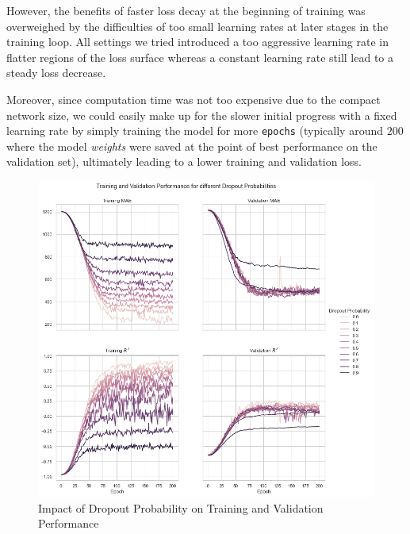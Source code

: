 \documentclass[12pt, letterpaper]{article}
\begin{document}
However, the benefits of faster loss decay at the beginning of training was overweighed by the difficulties of too small learning rates at later stages in the training loop.
All settings we tried introduced a too aggressive learning rate in flatter regions of the loss surface whereas a constant learning rate still lead to a steady loss decrease.

Moreover, since computation time was not too expensive due to the compact network size, we could easily make up for the slower initial progress with a fixed learning rate by simply training the model for more \texttt{epochs} (typically around $200$ where the model \emph{weights} were saved at the point of best performance on the validation set), ultimately leading to a lower training and validation loss.


\newpage




\appendix

\begin{figure}[t]
    \centering
    \includegraphics[width=\textwidth]{dropout_performance.png}
    \caption{Impact of Dropout Probability on Training and Validation Performance}
    \label{fig:dropout}
\end{figure}
\end{document}
